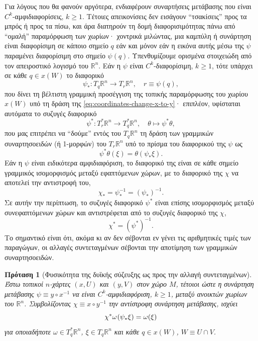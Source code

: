 \documentclass[11pt,a4paper,twoside,openright]{book}
\newtheorem{proposition}[lemma]{Πρόταση}
\begin{document}
Για λόγους που θα φανούν αργότερα,
ενδιαφέρουν συναρτήσεις μετάβασης
που είναι $C^k$-αμφιδιαφορίσεις, $k \ge 1$. Τέτοιες απεικονίσεις δεν εισάγουν ``τσακίσεις'' προς τα μπρός ή προς τα πίσω, και άρα διατηρούν τη δομή διαφορισιμότητας πάνω από ``ομαλή'' παραμόρφωση των χωρίων·
χοντρικά μιλώντας, μια καμπύλη ή συνάρτηση είναι διαφορίσιμη σε κάποιο σημείο $q$ εάν και μόνον εάν η εικόνα αυτής μέσω της $\psi$ παραμένει διαφορίσιμη στο σημείο $\psi(q)$.
Υπενθυμίζουμε ορισμένα στοιχειώδη
από τον απειροστικό λογισμό του $\mathbb{R}^n$.
Εάν η $\psi$ είναι $C^k$-διαφορίσιμη, $k \ge 1$, τότε υπάρχει σε κάθε $q \in x(W)$ το διαφορικό
\begin{equation}
\psi_*: T_q \mathbb{R}^n \to T_r \mathbb{R}^n,
\quad
r \equiv \psi(q),
\end{equation}
που δίνει τη βέλτιστη γραμμική προσέγγιση της τοπικής παραμόρφωσης του χωρίου $x(W)$ υπό τη δράση της \eqref{eq:coordinates-change-x-to-y}· επιπλέον, υφίσταται αυτόματα το συζυγές διαφορικό
\begin{equation}
\psi^*: T_r^* \mathbb{R}^n \to T_q^* \mathbb{R}^n,
\quad
\theta \mapsto \psi^* \hspace{0pt} \theta,
\end{equation}
που μας επιτρέπει να ``δούμε'' εντός του $T_q \mathbb{R}^n$
τη δράση των γραμμικών συναρτησοειδών
(ή 1-μορφών)
του $T_r \mathbb{R}^n$ υπό το πρίσμα του διαφορικού της $\psi$ ως
\begin{equation}
\psi^* \theta (\xi) = \theta(\psi_* \xi).
\end{equation}
Εάν η $\psi$ είναι ειδικότερα αμφιδιαφόριση, το διαφορικό της
είναι σε κάθε σημείο γραμμικός ισομορφισμός μεταξύ εφαπτόμενων χώρων, με το διαφορικό της $\chi$ να αποτελεί την αντιστροφή του,
\begin{equation}\label{eq:inverse-differential}
\chi_* = \psi_*^{-1} = \left(\psi_*\right)^{-1}.
\end{equation}
Σε αυτήν την περίπτωση, το συζυγές διαφορικό $\psi^*$
είναι επίσης ισομορφισμός μεταξύ συνεφαπτόμενων χώρων
και αντιστρέφεται από το συζυγές διαφορικό της $\chi$,
\begin{equation}
\chi^* = \left(\psi^*\right)^{-1}.
\end{equation}
Το σημαντικό είναι ότι, ακόμα κι αν δεν σέβονται εν γένει τις αριθμητικές τιμές των παραγώγων, οι αλλαγές συντεταγμένων σέβονται την αποτίμηση των γραμμικών συναρτησοειδών.
\begin{proposition}[Φυσικότητα της δυϊκής σύζευξης ως προς την αλλαγή συντεταγμένων]
	\label{prop:naturality-dual-action}
Έστω τοπικοί $n$-χάρτες $(x, U)$
και $(y, V)$ στον χώρο $M$, τέτοιοι ώστε η συνάρτηση μετάβασης $\psi \equiv y \circ x ^ {-1}$ να είναι $C^k$-αμφιδιαφόριση, $k \ge 1$, μεταξύ ανοικτών χωρίων του $\mathbb{R}^n$.
Συμβολίζοντας $\chi \equiv x \circ y ^ {-1}$
την αντίστροφη συνάρτηση μετάβασης, ισχύει
\begin{equation}\label{eq:naturality-dual-action}
\chi^*\omega \hspace{.5pt} (\psi_* \xi) = \omega(\xi)
\end{equation}
για οποιαδήποτε $\omega \in T_q^* \mathbb{R}^n$, $\xi \in T_q \mathbb{R}^n$ και κάθε $q \in x(W)$, $W \equiv U \cap V$.
\end{proposition}
\end{document}
